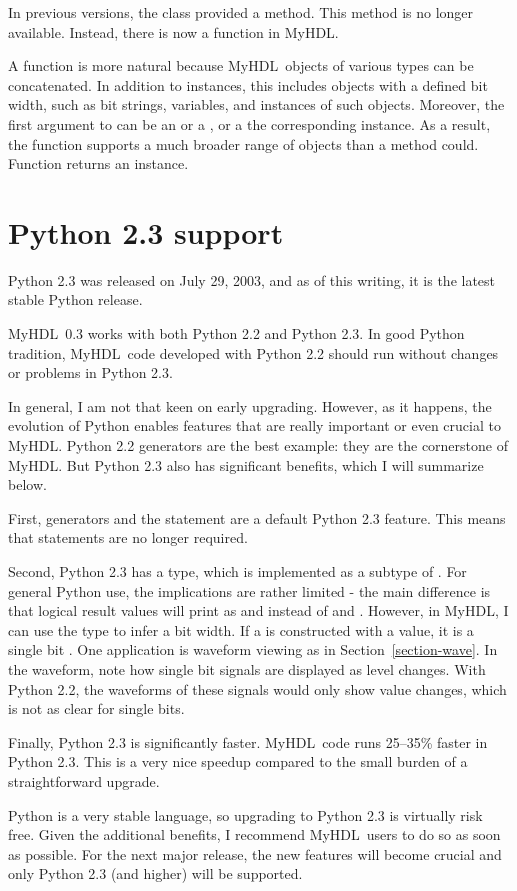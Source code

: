 \documentclass{howto}
\newcommand{\myhdl}{\protect \mbox{MyHDL}}
\begin{document}
In previous versions, the  class provided a
 method.  This method is no longer
available. Instead, there is now a  function
in \myhdl{}.

A function is more natural because \myhdl\ objects of various types
can be concatenated.  In addition to  instances, this
includes objects with a defined bit width, such as bit strings,
 variables, and  instances of such
objects. Moreover, the first argument to  can be an
 or a , or a the corresponding 
instance. As a result, the  function supports a
much broader range of objects than a method could.  Function
 returns an  instance.


\section{Python 2.3 support\label{section-Python}}

Python 2.3 was released on July 29, 2003, and as of this writing, it
is the latest stable Python release.

\myhdl\ 0.3 works with both Python 2.2 and Python 2.3. In good Python
tradition, \myhdl\ code developed with Python 2.2 should run without
changes or problems in Python 2.3.

In general, I am not that keen on early upgrading. However, as it
happens, the evolution of Python enables features that are really
important or even crucial to \myhdl{}.  Python 2.2 generators are the
best example: they are the cornerstone of \myhdl{}. But Python 2.3
also has significant benefits, which I will summarize below.

First, generators and the  statement are a default Python
2.3 feature. This means that 
statements are no longer required.

Second, Python 2.3 has a  type, which is implemented as a
subtype of . For general Python use, the implications are
rather limited - the main difference is that logical result values
will print as  and  instead of  and
. However, in \myhdl{}, I can use the  type to
infer a bit width.  If a  is constructed with a
 value, it is a single bit . One application
is waveform viewing as in Section~\ref{section-wave}. In the waveform,
note how single bit signals are displayed as level changes.  With
Python 2.2, the waveforms of these signals would only show value
changes, which is not as clear for single bits.

Finally, Python 2.3 is significantly faster. \myhdl\ code runs
25--35\% faster in Python 2.3. This is a very nice speedup compared to
the small burden of a straightforward upgrade.

Python is a very stable language, so upgrading to Python 2.3 is
virtually risk free. Given the additional benefits, I recommend
\myhdl\ users to do so as soon as possible. For the next major
release, the new features will become crucial and only Python 2.3 (and
higher) will be supported.
\end{document}
